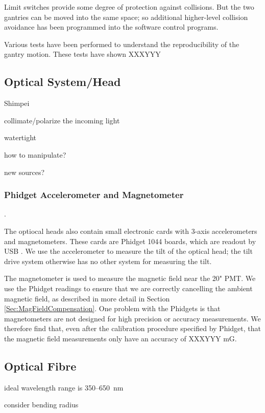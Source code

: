 Limit switches provide some degree of protection against collisions.  But the two gantries can
be moved into the same space; so additional higher-level collision avoidance has been
programmed into the software control programs.



Various tests have been performed to understand the reproducibility of the gantry motion.  These tests have shown
XXXYYY






\subsection{Optical System/Head}

Shimpei

collimate/polarize the incoming light

watertight

how to manipulate?

new sources?


\subsubsection{Phidget Accelerometer and Magnetometer}
\label{Sec:PhidgetAccMag}.

The optiocal heads also contain small electronic cards with 3-axis accelerometers and
magnetometers.  These cards are Phidget 1044 boards, which are readout by USB \cite{PhidgetRef}.
We use the accelerometer to measure the tilt of the optical head; the tilt drive system
otherwise has no other system for measuring the tilt.

The magnetometer is used to measure the magnetic field near the 20" PMT.  We use the Phidget
readings to ensure that we are correctly cancelling the ambient magnetic field, as described
in more detail in Section \ref{Sec:MagFieldCompensation}.
One problem with the Phidgets is that magnetometers are not designed for high precision or accuracy  measurements.
We therefore find that, even after the calibration procedure specified by Phidget, that the
magnetic field measurements only have an accuracy of XXXYYY mG.


\subsection{Optical Fibre}
ideal wavelength range is 350--650~nm

consider bending radius

